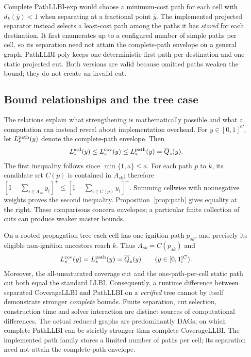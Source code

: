 Complete PathLLBI-exp would choose a minimum-cost path for each cell with
$d_k(\bar y)<1$ when separating at a fractional point $\bar y$.
The implemented projected separator instead selects a least-cost path
among the paths it has \emph{stored} for each destination. It first
enumerates up to a configured number of simple paths per cell, so its
separation need not attain the complete-path envelope on a general
graph. PathLLBI-poly keeps one deterministic first path per destination
and one static projected cut. Both versions are valid because omitted
paths weaken the bound; they do not create an invalid cut.

\subsection{Bound relationships and the tree case}\label{sec:relationships}

The relations explain what strengthening is mathematically possible and
what a computation can instead reveal about implementation overhead.
For $y\in[0,1]^C$, let $L_s^{\rm path}(y)$ denote the complete-path
envelope. Then
\begin{equation}\label{eq:hierarchy}
 L_s^{\rm std}(y)\le L_s^{\rm cov}(y)
          \le L_s^{\rm path}(y)=\overline Q_s(y).
\end{equation}
The first inequality follows since
$\min\{1,a\}\le a$. For each path $p$ to $k$, its candidate set
$C(p)$ is contained in $A_{sk}$; therefore
$[1-\sum_{i\in A_{sk}}y_i]^+
\le[1-\sum_{i\in C(p)}y_i]^+$. Summing cellwise with nonnegative
weights proves the second inequality. Proposition~\ref{prop:path}
gives equality at the right. These comparisons concern envelopes;
a particular finite collection of cuts can produce weaker master bounds.

On a rooted propagation tree each cell has one ignition path $p_{sk}$,
and precisely its eligible non-ignition ancestors reach $k$. Thus
$A_{sk}=C(p_{sk})$ and
\begin{equation}\label{eq:tree-equality}
 L_s^{\rm cov}(y)=L_s^{\rm path}(y)=\overline Q_s(y)
 \qquad(y\in[0,1]^C).
\end{equation}
Moreover, the all-unsaturated coverage cut and the one-path-per-cell
static path cut both equal the standard LLBI. Consequently, a runtime
difference between separated CoverageLLBI and PathLLBI on a \emph{verified}
tree cannot by itself demonstrate stronger \emph{complete} bounds. Finite
separation, cut selection, construction time and solver interaction are
distinct sources of computational differences. The actual reduced graphs
are predominantly DAGs, on which complete PathLLBI can be strictly
stronger than complete CoverageLLBI. The implemented path family stores
a limited number of paths per cell; its separation need not attain the
complete-path envelope.
